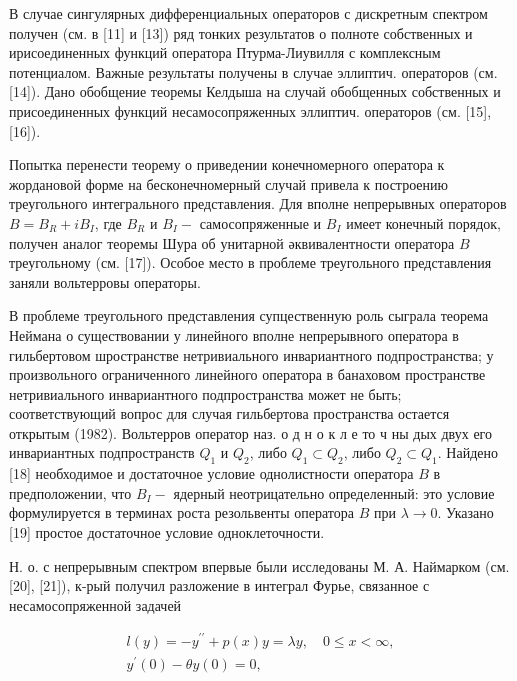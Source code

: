 \documentclass[10pt]{article}
\begin{document}
В случае сингулярных дифференциальных операторов с дискретным спектром получен (см. в [11] и [13]) ряд тонких результатов о полноте собственных и ирисоединенных функций оператора Птурма-Лиувилля с комплексным потенциалом. Важные результаты получены в случае эллиптич. операторов (см. [14]). Дано обобщение теоремы Келдыша на случай обобщенных собственных и присоединенных функций несамосопряженных эллиптич. операторов (см. [15], [16]).



Попытка перенести теорему о приведении конечномерного оператора к жордановой форме на бесконечномерный случай привела к построению треугольного интегрального представления. Для вполне непрерывных операторов $B=B_{R}+i B_{I}$, где $B_{R}$ и $B_{I}-$ самосопряженные и $B_{I}$ имеет конечный порядок, получен аналог теоремы Шура об унитарной әквивалентности оператора $B$ треугольному (см. [17]). Особое место в проблеме треугольного представления заняли вольтерровы операторы.



В проблеме треугольного представления супцественную роль сыграла теорема Неймана о существовании у линейного вполне непрерывного оператора в гильбертовом шространстве нетривиального инвариантного подпространства; у произвольного ограниченного линейного оператора в банаховом пространстве нетривиального инвариантного подпространства может не быть; соответствующий вопрос для случая гильбертова пространства остается открытым (1982). Вольтерров оператор наз. о д н о к л е то ч ны дых двух его инвариантных подпространств $Q_{1}$ и $Q_{2}$, либо $Q_{1} \subset Q_{2}$, либо $Q_{2} \subset Q_{1}$. Найдено [18] необходимое и достаточное условие однолистности оператора $B$ в предположении, что $B_{I}-$ ядерный неотрицательно определенный: это условие формулируется в терминах роста резольвенты оператора $B$ при $\lambda \rightarrow 0$. Указано [19] простое достаточное условие одноклеточности.



Н. о. с непрерывным спектром впервые были исследованы М. А. Наймарком (см. [20], [21]), к-рый получил разложение в интеграл Фурье, связанное с несамосопряженной задачей



\[

\begin{gathered}

l(y)=-y^{\prime \prime}+p(x) y=\lambda y, \quad 0 \leqslant x<\infty, \\

y^{\prime}(0)-\theta y(0)=0,

\end{gathered}

\]
\end{document}
